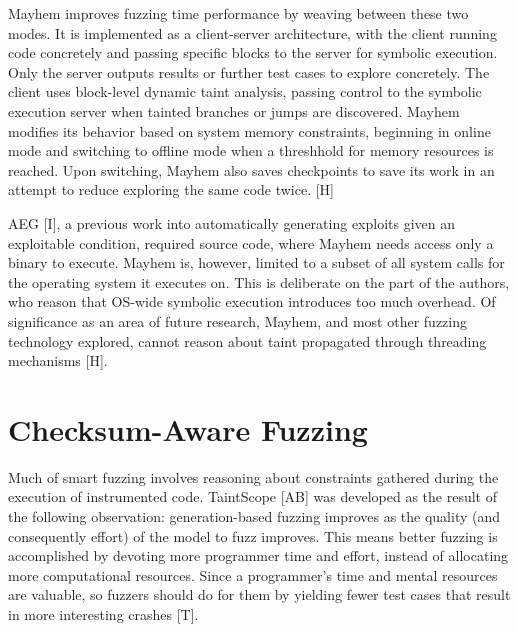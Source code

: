 \documentclass[11pt,expanded,copyright]{fsuthesis}
\begin{document}
Mayhem improves fuzzing time performance by weaving between these two modes. It is implemented as a client-server architecture, with the client running code concretely and passing specific blocks to the server for symbolic execution. Only the server outputs results or further test cases to explore concretely. The client uses block-level dynamic taint analysis, passing control to the symbolic execution server when tainted branches or jumps are discovered. Mayhem modifies its behavior based on system memory constraints, beginning in online mode and switching to offline mode when a threshhold for memory resources is reached. Upon switching, Mayhem also saves checkpoints to save its work in an attempt to reduce exploring the same code twice. [H]

AEG [I], a previous work into automatically generating exploits given an exploitable condition, required source code, where Mayhem needs access only a binary to execute. Mayhem is, however, limited to a subset of all system calls for the operating system it executes on. This is deliberate on the part of the authors, who reason that OS-wide symbolic execution introduces too much overhead. Of significance as an area of future research, Mayhem, and most other fuzzing technology explored, cannot reason about taint propagated through threading mechanisms [H].




\section{Checksum-Aware Fuzzing}

Much of smart fuzzing involves reasoning about constraints gathered during the execution of instrumented code. TaintScope [AB] was developed as the result of the following observation: generation-based fuzzing improves as the quality (and consequently effort) of the model to fuzz improves. This means better fuzzing is accomplished by devoting more programmer time and effort, instead of allocating more computational resources. Since a programmer's time and mental resources are valuable, so fuzzers should do for them by yielding fewer test cases that result in more interesting crashes [T].
\end{document}

